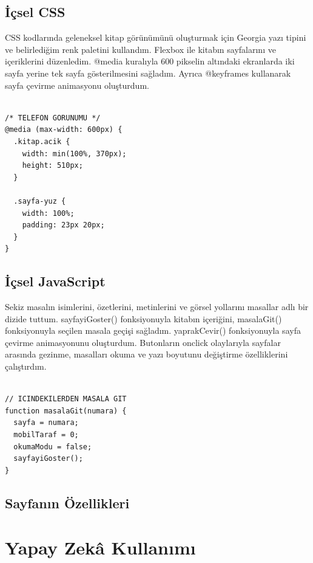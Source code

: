\documentclass[12pt,a4paper]{article}
\newcommand{\aciklama}[1]{{\color{black}\itshape #1}}
\begin{document}
\subsection{İçsel CSS}
CSS kodlarında geleneksel kitap görünümünü oluşturmak için Georgia yazı tipini ve belirlediğim renk paletini kullandım. Flexbox ile kitabın sayfalarını ve içeriklerini düzenledim. @media kuralıyla 600 pikselin altındaki ekranlarda iki sayfa yerine tek sayfa gösterilmesini sağladım. Ayrıca @keyframes kullanarak sayfa çevirme animasyonu oluşturdum.

\begin{lstlisting}[caption={İçsel CSS'ten önemli bir bölüm}]

/* TELEFON GORUNUMU */
@media (max-width: 600px) {
  .kitap.acik {
    width: min(100%, 370px);
    height: 510px;
  }

  .sayfa-yuz {
    width: 100%;
    padding: 23px 20px;
  }
}

\end{lstlisting}

\subsection{İçsel JavaScript}
Sekiz masalın isimlerini, özetlerini, metinlerini ve görsel yollarını masallar adlı bir dizide tuttum. sayfayiGoster() fonksiyonuyla kitabın içeriğini, masalaGit() fonksiyonuyla seçilen masala geçişi sağladım. yaprakCevir() fonksiyonuyla sayfa çevirme animasyonunu oluşturdum. Butonların onclick olaylarıyla sayfalar arasında gezinme, masalları okuma ve yazı boyutunu değiştirme özelliklerini çalıştırdım.
\begin{lstlisting}[caption={İçsel JavaScript'ten önemli bir bölüm}]

// ICINDEKILERDEN MASALA GIT
function masalaGit(numara) {
  sayfa = numara;
  mobilTaraf = 0;
  okumaModu = false;
  sayfayiGoster();
}

\end{lstlisting}

\subsection{Sayfanın Özellikleri}


\section{Yapay Zekâ Kullanımı}
\aciklama{}
\end{document}
